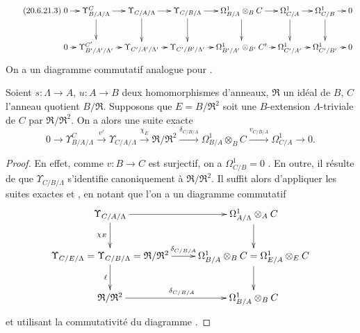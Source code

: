 \begin{remarks}[20.6.21]
\begin{enumerate}
\begin{equation}
\tag{20.6.21.3}
\label{0.20.6.21.3-fr}
\xymatrix@C=0.7em{
  0 \ar[r] & \Upsilon^C_{B/A/\Lambda} \ar[r] \ar[d] &
  \Upsilon_{C/A/\Lambda} \ar[r] \ar[d] &
  \Upsilon_{C/B/\Lambda} \ar[r] \ar[d] &
  \Omega^1_{B/A}\otimes_B C \ar[r] \ar[d] &
  \Omega^1_{C/A} \ar[r] \ar[d] &
  \Omega^1_{C/B} \ar[r] \ar[d] & 0 \\
  0 \ar[r] & \Upsilon^{C'}_{B'/A'/\Lambda'} \ar[r] &
  \Upsilon_{C'/A'/\Lambda'} \ar[r] &
  \Upsilon_{C'/B'/\Lambda'} \ar[r] &
  \Omega^1_{B'/A'}\otimes_{B'} C' \ar[r] &
  \Omega^1_{C'/A'} \ar[r] & \Omega^1_{C'/B'} \ar[r] & 0
}
\end{equation}
On a un diagramme commutatif analogue pour .
\end{enumerate}
\end{remarks}

\begin{proposition}[20.6.22]
\label{0.20.6.22-fr}
Soient $s:\Lambda\to A$, $u:A\to B$ deux homomorphismes d'anneaux,
$\mathfrak{R}$ un idéal de $B$, $C$ l'anneau quotient $B/\mathfrak{R}$.
Supposons que $E=B/\mathfrak{R}^2$ soit une $B$-extension
$\Lambda$-triviale de $C$ par $\mathfrak{R}/\mathfrak{R}^2$. On a alors une
suite exacte
\begin{equation}
\tag{20.6.22.1}
\label{0.20.6.22.1-fr}
  0\to\Upsilon^C_{B/A/\Lambda}\xrightarrow{v'}
  \Upsilon_{C/A/\Lambda}\xrightarrow{\chi_E}
  \mathfrak{R}/\mathfrak{R}^2\xrightarrow{\delta_{C/B/A}}
  \Omega^1_{B/A}\otimes_B C\xrightarrow{v_{C/B/A}}
  \Omega^1_{C/A}\to0.
\end{equation}
\end{proposition}

\begin{proof}
En effet, comme $v:B\to C$ est surjectif, on a $\Omega^1_{C/B}=0$
. En outre, il résulte de  que
$\Upsilon_{C/B/\Lambda}$ s'identifie canoniquement à
$\mathfrak{R}/\mathfrak{R}^2$. Il suffit alors d'appliquer les suites exactes
 et , en notant que l'on a un
diagramme commutatif
\[
\xymatrix{
  \Upsilon_{C/A/\Lambda} \ar[r] \ar[d]_{\chi_E} &
  \Omega^1_{A/\Lambda}\otimes_A C \ar[d] \\
  \Upsilon_{C/E/\Lambda}=\Upsilon_{C/B/\Lambda}=\mathfrak{R}/\mathfrak{R}^2
    \ar[r]^-{\delta_{C/B/A}} \ar[d]_{\ell} &
  \Omega^1_{B/A}\otimes_B C=\Omega^1_{E/A}\otimes_E C \ar[d] \\
  \mathfrak{R}/\mathfrak{R}^2 \ar[r]^{\delta_{C/B/A}} &
  \Omega^1_{B/A}\otimes_B C
}
\]
et utilisant la commutativité du diagramme .
\end{proof}

